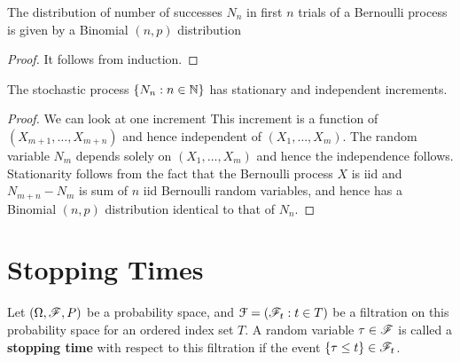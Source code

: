 \documentclass[a4paper,10pt,english]{article}
\begin{document}
\begin{thm} The distribution of number of successes $N_n$ in first $n$ trials of a Bernoulli process is given by a Binomial $(n,p)$ distribution 
\end{thm}
\begin{proof} 
It follows from induction. 
\end{proof}
\begin{cor} 
The stochastic process $\{N_n: n \in \mathbb{N}\}$ has stationary and independent increments.
\end{cor}
\begin{proof}
We can look at one increment 
This increment is a function of $(X_{m+1}, \dots, X_{m+n})$ and hence independent of $(X_1, \dots, X_m)$. 
The random variable $N_m$ depends solely on $(X_1, \dots, X_m)$ and hence the independence follows. 
Stationarity follows from the fact that the Bernoulli process $X$ is iid and $N_{m+n}-N_m$ is sum of $n$ iid Bernoulli random variables, 
and hence has a Binomial $(n,p)$ distribution identical to that of $N_n$. 
\end{proof}



\section{Stopping Times}
Let $(\Omega, \mathscr{F}, P)$ be a probability space, and $\mathcal{F} = (\mathscr{F}_t: t \in T)$ be a filtration on this probability space for an ordered index set $T$.   
A random variable $\tau \in \mathscr{F}$ is called a \textbf{stopping time} with respect to this filtration if the event $\{\tau \leq t\} \in \mathscr{F}_t$. 
\end{document}

